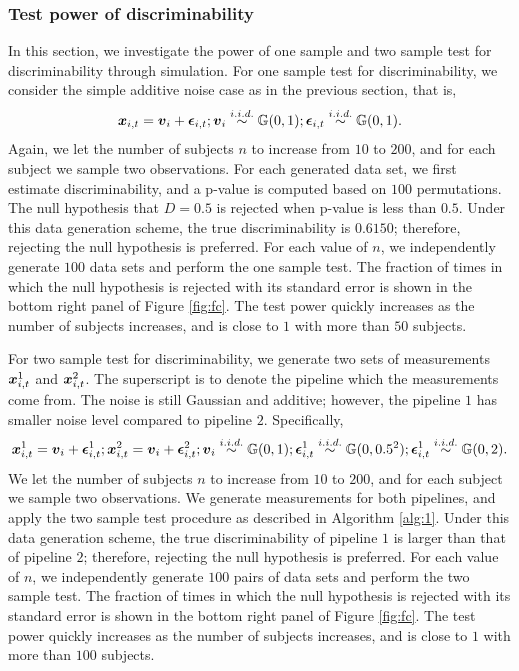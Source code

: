 \documentclass{article}
\begin{document}
\subsubsection{Test power of discriminability}
In this section, we investigate the power of one sample and two sample test for discriminability through simulation. For one sample test for discriminability, we consider the simple additive noise case as in the previous section, that is,
\[\boldsymbol{x}_{i,t}= \boldsymbol{v}_{i} + \boldsymbol{\epsilon}_{i,t}; \boldsymbol{v}_i \overset{i.i.d.}{\sim} \mathbb{G}(0,1); \boldsymbol{\epsilon}_{i,t} \overset{i.i.d.}{\sim} \mathbb{G}(0,1). \]
Again, we let the number of subjects $n$ to increase from $10$ to $200$, and for each subject we sample two observations. For each generated data set, we first estimate discriminability, and a p-value is computed based on $100$ permutations. The null hypothesis that $D=0.5$ is rejected when p-value is less than $0.5$. Under this data generation scheme, the true discriminability is $0.6150$; therefore, rejecting the null hypothesis is preferred. For each value of $n$, we independently generate $100$ data sets and perform the one sample test. The fraction of times in which the null hypothesis is rejected with its standard error is shown in the bottom right panel of Figure \ref{fig:fc}. The test power quickly increases as the number of subjects increases, and is close to $1$ with more than $50$ subjects.

For two sample test for discriminability, we generate two sets of measurements ${\boldsymbol{x}_{i,t}^1}$ and ${\boldsymbol{x}_{i,t}^2}$. The superscript is to denote the pipeline which the measurements come from. The noise is still Gaussian and additive; however, the pipeline $1$ has smaller noise level compared to pipeline $2$. Specifically,
\[\boldsymbol{x}_{i,t}^1= \boldsymbol{v}_{i} + \boldsymbol{\epsilon}_{i,t}^1; \boldsymbol{x}_{i,t}^2= \boldsymbol{v}_{i} + \boldsymbol{\epsilon}_{i,t}^2; \boldsymbol{v}_i \overset{i.i.d.}{\sim} \mathbb{G}(0,1); \boldsymbol{\epsilon}_{i,t}^1 \overset{i.i.d.}{\sim} \mathbb{G}(0,0.5^2);\boldsymbol{\epsilon}_{i,t}^1 \overset{i.i.d.}{\sim} \mathbb{G}(0,2). \]
We let the number of subjects $n$ to increase from $10$ to $200$, and for each subject we sample two observations. We generate measurements for both pipelines, and apply the two sample test procedure as described in Algorithm \ref{alg:1}. Under this data generation scheme, the true discriminability of pipeline $1$ is larger than that of pipeline $2$; therefore, rejecting the null hypothesis is preferred. For each value of $n$, we independently generate $100$ pairs of data sets and perform the two sample test. The fraction of times in which the null hypothesis is rejected with its standard error is shown in the bottom right panel of Figure \ref{fig:fc}. The test power quickly increases as the  number of subjects increases, and is close to $1$ with more than $100$ subjects.
\end{document}
